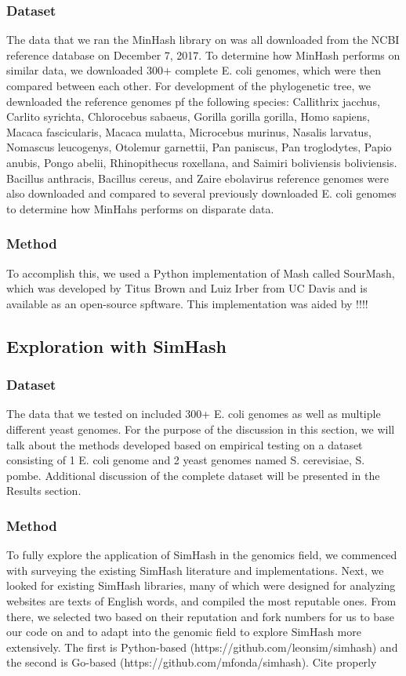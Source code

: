 \documentclass[12pt, letterpaper]{article}
\begin{document}
\subsubsection{Dataset}
The data that we ran the MinHash library on was all downloaded from the NCBI reference database on December 7, 2017. To determine how MinHash performs on similar data, we downloaded 300+ complete E. coli genomes, which were then compared between each other. For development of the phylogenetic tree, we dewnloaded the reference genomes pf the following species: Callithrix jacchus, Carlito syrichta, Chlorocebus sabaeus, Gorilla gorilla gorilla, Homo sapiens, Macaca fascicularis, Macaca mulatta, Microcebus murinus, Nasalis larvatus, Nomascus leucogenys, Otolemur garnettii, Pan paniscus, Pan troglodytes, Papio anubis, Pongo abelii, Rhinopithecus roxellana, and Saimiri boliviensis boliviensis. Bacillus anthracis, Bacillus cereus, and Zaire ebolavirus reference genomes were also downloaded and compared to several previously downloaded E. coli genomes to determine how MinHahs performs on disparate data.

\subsubsection{Method}
To accomplish this, we used a Python implementation of Mash called SourMash, which was developed by Titus Brown and Luiz Irber from UC Davis and is available as an open-source spftware.\cite{GitHub-SourMash} This implementation was aided by !!!!

\subsection{Exploration with SimHash}
\subsubsection{Dataset}
The data that we tested on included 300+ E. coli genomes as well as multiple different yeast genomes. For the purpose of the discussion in this section, we will talk about the methods developed based on empirical testing on a dataset consisting of 1 E. coli genome and 2 yeast genomes named S. cerevisiae, S. pombe. Additional discussion of the complete dataset will be presented in the Results section.

\subsubsection{Method}
To fully explore the application of SimHash in the genomics field, we commenced with surveying the existing SimHash literature and implementations. Next, we looked for existing SimHash libraries, many of which were designed for analyzing websites are texts of English words, and compiled the most reputable ones. From there, we selected two based on their reputation and fork numbers for us to base our code on and to adapt into the genomic field to explore SimHash more extensively. The first is Python-based (https://github.com/leonsim/simhash) and the second is Go-based (https://github.com/mfonda/simhash). \color{red} Cite properly \color{black}
\end{document}
